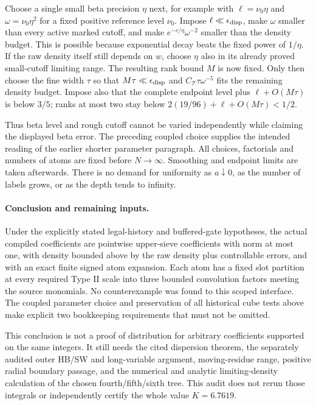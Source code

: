 Choose a single small beta precision $\eta$ next, for example with
$\ell=\nu_0\eta$ and $\omega=\nu_0\eta^2$ for a fixed positive
reference level $\nu_0$. Impose $\ell\ll\epsilon_{\rm disp}$,
make $\omega$ smaller than every active marked cutoff, and make
$e^{-c/\eta}\omega^{-2}$ smaller than the density budget.
This is possible because exponential decay beats the fixed power of
$1/\eta$. If the raw density itself still depends on $w$, choose
$\eta$ also in its already proved small-cutoff limiting range.
The resulting rank bound $M$ is now fixed. Only then choose the fine
width $\tau$ so that $M\tau\ll\epsilon_{\rm disp}$ and
$C_{\mathcal T}\tau\omega^{-5}$ fits the remaining density budget.
Impose also that the complete endpoint level plus $\ell+O(M\tau)$
is below $3/5$; ranks at most two stay below
$2(19/96)+\ell+O(M\tau)<1/2$.

Thus beta level and rough cutoff cannot be varied independently while
claiming the displayed beta error. The preceding coupled choice
supplies the intended reading of the earlier shorter parameter paragraph.
All choices, factorials and numbers of atoms are fixed before
$N\to\infty$. Smoothing and endpoint limits are taken afterwards.
There is no demand for uniformity as $a\downarrow0$, as the number of
labels grows, or as the depth tends to infinity.

\paragraph{Conclusion and remaining inputs.}
Under the explicitly stated legal-history and buffered-gate hypotheses,
the actual compiled coefficients are pointwise upper-sieve coefficients
with norm at most one, with density bounded above by the raw density
plus controllable errors, and with an exact finite signed atom expansion.
Each atom has a fixed slot partition at every required Type II scale
into three bounded convolution factors meeting the source monomials.
No counterexample was found to this scoped interface. The coupled
parameter choice and preservation of all historical cube tests above
make explicit two bookkeeping requirements that must not be omitted.

This conclusion is not a proof of distribution for arbitrary
coefficients supported on the same integers. It still needs the cited
dispersion theorem, the separately audited outer HB/SW and long-variable
argument, moving-residue range, positive radial boundary passage, and
the numerical and analytic limiting-density calculation of the chosen
fourth/fifth/sixth tree. This audit does not rerun those integrals or
independently certify the whole value $K=6.7619$.
